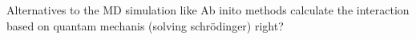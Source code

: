 Alternatives to the MD simulation like Ab inito methods calculate the interaction based on quantam mechanis (solving schrödinger) right?























